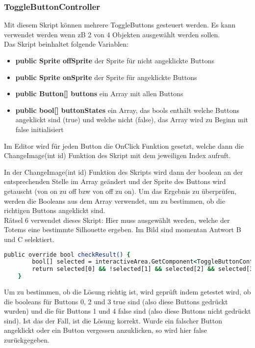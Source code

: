 {\subsubsection{ToggleButtonController}
Mit diesem Skript können mehrere ToggleButtons gesteuert werden. Es kann verwendet werden wenn zB 2 von 4 Objekten ausgewählt werden sollen.\\
Das Skript beinhaltet folgende Variablen:
\begin{itemize}
\item \textbf{public Sprite offSprite} der Sprite für nicht angeklickte Buttons
\item \textbf{public Sprite onSprite} der Sprite für angeklickte Buttons
\item \textbf{public Button[] buttons} ein Array mit allen Buttons
\item \textbf{public bool[] buttonStates} ein Array, das bools enthält welche Buttons angeklickt sind (true) und welche nicht (false), das Array wird zu Beginn mit false initialisiert
\end{itemize}

Im Editor wird für jeden Button die OnClick Funktion gesetzt, welche dann die ChangeImage(int id) Funktion des Skript mit dem jeweiligen Index aufruft.

In der ChangeImage(int id) Funktion des Skripts wird dann der boolean an der entsprechenden Stelle im Array geändert und der Sprite des Buttons wird getauscht (von on zu off bzw von off zu on). Um das Ergebnis zu überprüfen, werden die Booleans aus dem Array verwendet, um zu bestimmen, ob die richtigen Buttons angeklickt sind.\\

Rätsel 6 verwendet dieses Skript:
Hier muss ausgewählt werden, welche der Totems eine bestimmte Silhouette ergeben. Im Bild sind momentan Antwort B und C selektiert.
\begin{lstlisting}[language=csh, caption={checkResult Methode in der Klasse von Rätsel 6}]
public override bool checkResult() {
        bool[] selected = interactiveArea.GetComponent<ToggleButtonController>().buttonStates;
        return selected[0] && !selected[1] && selected[2] && selected[3] && !selected[4];
    }
\end{lstlisting}
Um zu bestimmen, ob die Lösung richtig ist, wird geprüft indem getestet wird, ob die booleans für Buttons 0, 2 und 3 true sind (also diese Buttons gedrückt wurden) und die für Buttons 1 und 4 false sind (also diese Buttons nicht gedrückt sind). Ist das der Fall, ist die Lösung korrekt. Wurde ein falscher Button angeklickt oder ein Button vergessen anzuklicken, so wird hier false zurückgegeben.

}
